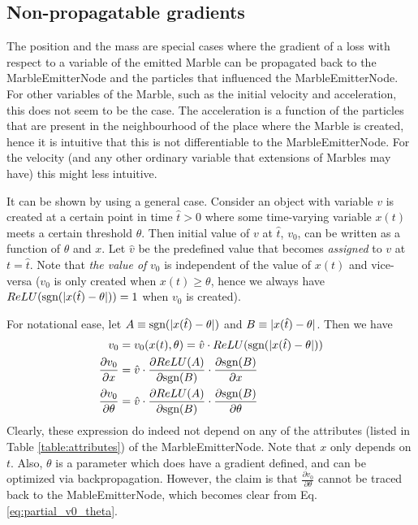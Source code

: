 \subsection{Non-propagatable gradients}

The position and the mass are special cases where the gradient of a loss with respect to a variable of the emitted Marble can be propagated back to the MarbleEmitterNode and the particles that influenced the MarbleEmitterNode. For other variables of the Marble, such as the initial velocity and acceleration, this does not seem to be the case. The acceleration is a function of the particles that are present in the neighbourhood of the place where the Marble is created, hence it is intuitive that this is not differentiable to the MarbleEmitterNode. For the velocity (and any other ordinary variable that extensions of Marbles may have) this might less intuitive.

It can be shown by using a general case. Consider an object with variable $v$ is created at a certain point in time $\hat{t} > 0$ where some time-varying variable $x(t)$ meets a certain threshold $\theta$. Then initial value of $v$ at $\hat{t}$, $v_0$, can be written as a function of $\theta$ and $x$. Let $\hat{v}$ be the predefined value that becomes \textit{assigned} to $v$ at $t = \hat{t}$. Note that \textit{the value of} $v_0$ is independent of the value of $x(t)$ and vice-versa ($v_0$ is only created when $x(t) \geq \theta$, hence we always have $ReLU(\text{sgn}(\lvert x(\hat{t}) - \theta \rvert)) = 1$ when $v_0$ is created).

For notational ease, let $A \equiv \text{sgn}(\lvert x(\hat{t}) - \theta \rvert)$ and $B \equiv \lvert x(\hat{t}) - \theta \rvert$. Then we have 
\begin{align}
    v_0 &= v_0(x(t), \theta) = \hat{v} \cdot ReLU(\text{sgn}(\lvert x(\hat{t}) - \theta \rvert)) \\
    \frac{\partial v_0}{\partial x} &= \hat{v} \cdot \frac{\partial ReLU(A)}{\partial \text{sgn}(B)} \cdot \frac{\partial \text{sgn}(B)}{\partial x} \\
    \frac{\partial v_0}{\partial \theta} &= \hat{v} \cdot \frac{\partial ReLU(A)}{\partial \text{sgn}(B)} \cdot \frac{\partial \text{sgn}(B)}{\partial \theta} \label{eq:partial_v0_theta}
\end{align}
Clearly, these expression do indeed not depend on any of the attributes (listed in Table \ref{table:attributes}) of the MarbleEmitterNode. Note that $x$ only depends on $t$. Also, $\theta$ is a parameter which does have a gradient defined, and can be optimized via backpropagation. However, the claim is that $\frac{\partial v_0}{\partial \theta}$ cannot be traced back to the MableEmitterNode, which becomes clear from Eq. \eqref{eq:partial_v0_theta}.

